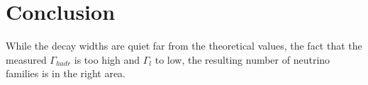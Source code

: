 \documentclass[]{article}
\begin{document}
\section{Conclusion}
While the decay widths are quiet far from the theoretical values, the fact that the measured $\Gamma_{hadr}$ is too high and $\Gamma_{l}$ to low, the resulting number of neutrino families is in the right area.

\pagebreak
\nocite{*}
\printbibliography
\end{document}

